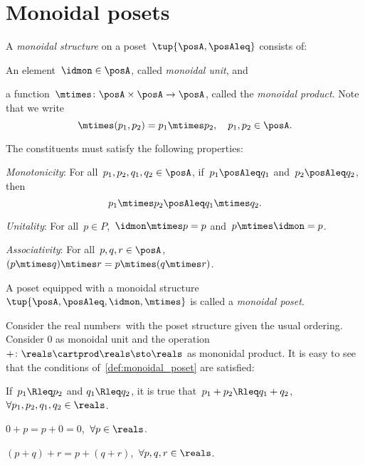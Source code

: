

\section{Monoidal posets}\label{sec:parallelism-monoidal-posets}

\begin{definition}
  \label{def:monoidal_poset}
  A \emph{monoidal structure} on a poset~$\tup{\posA,\posAleq}$ consists of:
  \begin{compactenum}
    \item An element~$\idmon\in \posA$, called \emph{monoidal unit}, and
    \item a function~$\mtimes\colon \posA\times \posA\to \posA$, called the \emph{monoidal product}. Note that we write
    \begin{equation*}
      \mtimes(p_1,p_2)=p_1\mtimes p_2, \quad p_1,p_2\in \posA.
    \end{equation*}
  \end{compactenum}
  The constituents must satisfy the following properties:
  \begin{compactenum}[(a)]
    \item \emph{Monotonicity}: For all~$p_1,p_2,q_1,q_2\in \posA$, if~$p_1\posAleq q_1$ and~$p_2\posAleq q_2$, then
    \begin{equation*}
      p_1\mtimes p_2\posAleq q_1\mtimes q_2.
    \end{equation*}
    \item \emph{Unitality}: For all~$p\in P$,~$\idmon\mtimes p=p$ and~$p\mtimes \idmon=p$.
    \item \emph{Associativity}: For all~$p,q,r\in \posA $, $(p\mtimes q)\mtimes r=p\mtimes (q\mtimes r)$.
  \end{compactenum}
  A poset equipped with a monoidal structure $\tup{\posA,\posAleq,\idmon,\mtimes}$ is called a \emph{monoidal poset}.
\end{definition}

\begin{example}
  \label{ex:monoidal_pos_reals}
  Consider the real numbers~\reals with the poset structure given the usual ordering. Consider 0 as monoidal unit and the operation~$+\colon \reals\cartprod \reals\sto \reals$ as mononidal product. It is easy to see that the conditions of~\cref{def:monoidal_poset} are satisfied:
  \begin{compactenum}[(a)]
    \item If~$p_1\Rleq  p_2$ and $q_1\Rleq  q_2$, it is true that~$p_1+p_2\Rleq  q_1+q_2$,~$\forall p_1,p_2,q_1,q_2\in \reals$.
    \item $0+p=p+0=0$,~$\forall p\in \reals$.
    \item $(p+q)+r=p+(q+r)$,~$\forall p,q,r\in \reals$.
  \end{compactenum}
\end{example}

